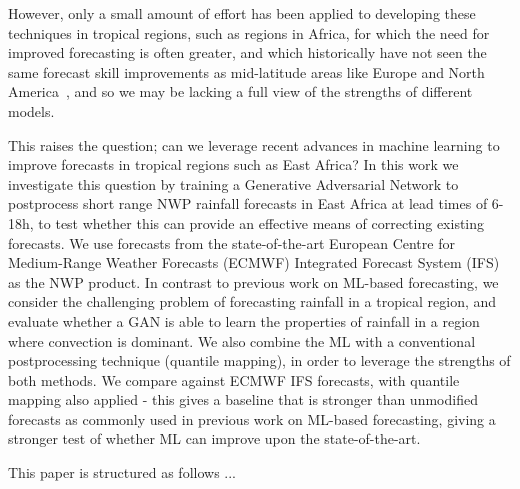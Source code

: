 \documentclass{article}
\begin{document}
However, only a small amount of effort has been applied to developing these techniques in tropical regions, such as regions in Africa, for which the need for improved forecasting is often greater, and which historically have not seen the same forecast skill improvements as mid-latitude areas like Europe and North America~\citep{youds_gcrf_2021}, and so we may be lacking a full view of the strengths of different models.

This raises the question; can we leverage recent advances in machine learning to improve forecasts in tropical regions such as East Africa? In this work we investigate this question by training a Generative Adversarial Network to postprocess short range NWP rainfall forecasts in East Africa at lead times of 6-18h, to test whether this can provide an effective means of correcting existing forecasts. We use forecasts from the state-of-the-art European Centre for Medium-Range Weather Forecasts (ECMWF) Integrated Forecast System (IFS) as the NWP product. In contrast to previous work on ML-based forecasting, we consider the challenging problem of forecasting rainfall in a tropical region, and evaluate whether a GAN is able to learn the properties of rainfall in a region where convection is dominant. We also combine the ML with a conventional postprocessing technique (quantile mapping), in order to leverage the strengths of both methods. We compare against ECMWF IFS forecasts, with quantile mapping also applied - this gives a baseline that is stronger than unmodified forecasts as commonly used in previous work on ML-based forecasting, giving a stronger test of whether ML can improve upon the state-of-the-art. 

This paper is structured as follows ... 





\end{document}
